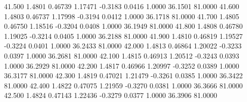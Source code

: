   41.500   1.4801   0.46739   1.17471  -0.3183   0.0416   1.0000  36.1501  81.0000
  41.600   1.4803   0.46737   1.17998  -0.3194   0.0412   1.0000  36.1718  81.0000
  41.700   1.4805   0.46750   1.18516  -0.3204   0.0408   1.0000  36.1949  81.0000
  41.800   1.4808   0.46780   1.19025  -0.3214   0.0405   1.0000  36.2188  81.0000
  41.900   1.4810   0.46819   1.19527  -0.3224   0.0401   1.0000  36.2433  81.0000
  42.000   1.4813   0.46864   1.20022  -0.3233   0.0397   1.0000  36.2681  81.0000
  42.100   1.4815   0.46913   1.20512  -0.3243   0.0393   1.0000  36.2929  81.0000
  42.200   1.4817   0.46966   1.20997  -0.3252   0.0389   1.0000  36.3177  81.0000
  42.300   1.4819   0.47021   1.21479  -0.3261   0.0385   1.0000  36.3422  81.0000
  42.400   1.4822   0.47075   1.21959  -0.3270   0.0381   1.0000  36.3666  81.0000
  42.500   1.4824   0.47143   1.22436  -0.3279   0.0377   1.0000  36.3906  81.0000
